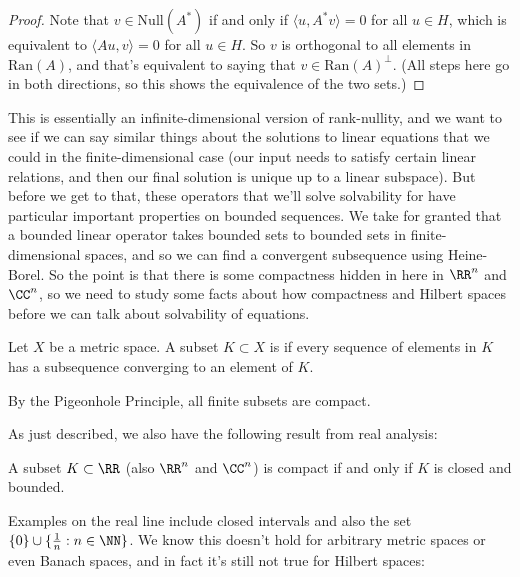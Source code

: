 \begin{proof}
Note that $v \in \text{Null}(A^\ast)$ if and only if $\langle u, A^\ast v \rangle = 0$ for all $u \in H$, which is equivalent to $\langle Au, v \rangle = 0$ for all $u \in H$. So $v$ is orthogonal to all elements in $\text{Ran}(A)$, and that's equivalent to saying that $v \in \text{Ran}(A)^\perp$. (All steps here go in both directions, so this shows the equivalence of the two sets.)
\end{proof}

This is essentially an infinite-dimensional version of rank-nullity, and we want to see if we can say similar things about the solutions to linear equations that we could in the finite-dimensional case (our input needs to satisfy certain linear relations, and then our final solution is unique up to a linear subspace). But before we get to that, these operators that we'll solve solvability for have particular important properties on bounded sequences. We take for granted that a bounded linear operator takes bounded sets to bounded sets in finite-dimensional spaces, and so we can find a convergent subsequence using Heine-Borel. So the point is that there is some compactness hidden in here in $\RR^n$ and $\CC^n$, so we need to study some facts about how compactness and Hilbert spaces before we can talk about solvability of equations.

\begin{definition}
Let $X$ be a metric space. A subset $K \subset X$ is  if every sequence of elements in $K$ has a subsequence converging to an element of $K$. 
\end{definition}

\begin{example}
By the Pigeonhole Principle, all finite subsets are compact.
\end{example}

As just described, we also have the following result from real analysis:

\begin{theorem}
A subset $K \subset \RR$ (also $\RR^n$ and $\CC^n$) is compact if and only if $K$ is closed and bounded.
\end{theorem}

Examples on the real line include closed intervals and also the set $\{0\} \cup \{\frac{1}{n}: n \in \NN\}$. We know this doesn't hold for arbitrary metric spaces or even Banach spaces, and in fact it's still not true for Hilbert spaces:

